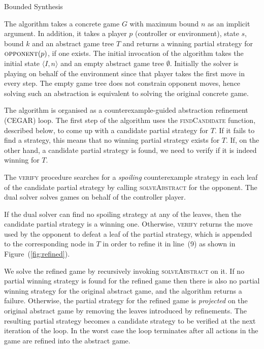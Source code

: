 \documentclass{llncs}
\begin{document}
\begin{algorithm}
    \caption{Bounded Synthesis}
    \label{alg:bounded}
\end{algorithm}

The algorithm takes a concrete game $G$ with maximum bound $n$ as an implicit
argument.  In addition, it takes a player $p$ (controller or environment),
state $s$, bound $k$ and an abstract game tree $T$ and returns a winning
partial strategy for $\textsc{opponent}(p)$, if one exists.  The initial
invocation of the algorithm takes the initial state $\langle I, n\rangle$ and
an empty abstract game tree $\emptyset$.  Initially the solver is playing on
behalf of the environment since that player takes the first move in every step.
The empty game tree does not constrain opponent moves, hence solving such an
abstraction is equivalent to solving the original concrete game.

The algorithm is organised as a counterexample-guided abstraction refinement
(CEGAR) loop.  The first step of the algorithm uses the \textsc{findCandidate}
function, described below, to come up with a candidate partial strategy for
$T$. If it fails to find a strategy, this means that no winning partial
strategy exists for $T$.  If, on the other hand, a candidate partial strategy
is found, we need to verify if it is indeed winning for $T$.

The \textsc{verify} procedure searches for a \emph{spoiling} counterexample
strategy in each leaf of the candidate partial strategy by calling
\textsc{solveAbstract} for the opponent. The dual solver solves games on behalf
of the controller player.  

If the dual solver can find no spoiling strategy at any of the leaves, then the
candidate partial strategy is a winning one. Otherwise, \textsc{verify} returns
the move used by the opponent to defeat a leaf of the partial strategy, which
is appended to the corresponding node in $T$ in order to refine it in line~(9)
as shown in Figure~(\ref{fig:refined}).

We solve the refined game by recursively invoking \textsc{solveAbstract} on it.
If no partial winning strategy is found for the refined game then there is also
no partial winning strategy for the original abstract game, and the algorithm
returns a failure.  Otherwise, the partial strategy for the refined game is
\emph{projected} on the original abstract game by removing the leaves
introduced by refinements. The resulting partial strategy becomes a candidate
strategy to be verified at the next iteration of the loop. In the worst case
the loop terminates after all actions in the game are refined into the abstract
game.
\end{document}
